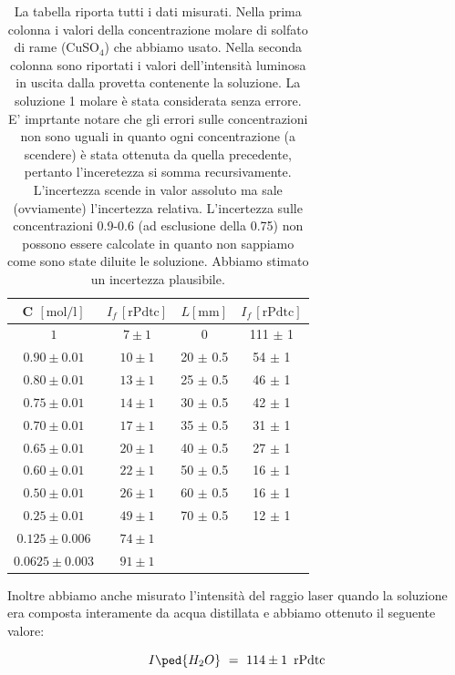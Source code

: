\begin{table}
    \centering
    \small
    \begin{tabular}{c c | c c}
        C $[\si{\mole\per\litre}]$ & $I_f \, [\text{rPdtc}]$ & $L [\si{\milli\m}]$ & $I_f \, [\text{rPdtc}]$ \\
        \midrule
        $1$ 	& $7 \pm 1$               &  0                & 111 $\pm$ 1                 \\
        $0.90 \pm 0.01$ 	& $10 \pm 1$              &  20 $\pm$ 0.5     & 54 $\pm$ 1                    \\        
        $0.80 \pm 0.01$ 	& $13 \pm 1$              &  25 $\pm$ 0.5     & 46 $\pm$ 1                    \\
        $0.75 \pm 0.01$ 	& $14 \pm 1$              &  30 $\pm$ 0.5     & 42 $\pm$ 1                    \\
        $0.70 \pm 0.01$ 	& $17 \pm 1$              &  35 $\pm$ 0.5     & 31 $\pm$ 1                      \\
        $0.65 \pm 0.01$ 	& $20 \pm 1$              &  40 $\pm$ 0.5     & 27 $\pm$ 1                    \\
        $0.60 \pm 0.01$ 	& $22 \pm 1$              &  50 $\pm$ 0.5     & 16 $\pm$ 1                    \\
        $0.50 \pm 0.01$ 	& $26 \pm 1$  &  60 $\pm$ 0.5     & 16 $\pm$ 1                    \\
        $0.25 \pm 0.01$ 	& $49 \pm 1$  &  70 $\pm$ 0.5     & 12 $\pm$ 1                      \\
        $0.125 \pm 0.006$ & $74 \pm 1$      && \\
        $0.0625 \pm 0.003$ & $91 \pm 1$     && \\
        \bottomrule
    \end{tabular}
    \caption{La tabella riporta tutti i dati misurati. Nella prima colonna i valori della concentrazione molare di solfato di rame (CuSO$_4$) che abbiamo usato. Nella seconda colonna sono riportati i valori dell'intensità luminosa in uscita dalla provetta contenente la soluzione. La soluzione 1 molare è stata considerata senza errore. E' imprtante notare che gli errori sulle concentrazioni non sono uguali in quanto ogni concentrazione (a scendere) è stata ottenuta da quella precedente, pertanto l'inceretezza si somma recursivamente. L'incertezza scende in valor assoluto ma sale (ovviamente) l'incertezza relativa. L'incertezza sulle concentrazioni 0.9-0.6 (ad esclusione della 0.75) non possono essere calcolate in quanto non sappiamo come sono state diluite le soluzione. Abbiamo stimato un incertezza plausibile.}
    \label{tab:dati}
\end{table}

Inoltre abbiamo anche misurato l'intensità del raggio laser quando la soluzione era composta interamente da acqua distillata e abbiamo ottenuto il seguente valore:

\begin{equation}
	I\ped{H_2O} \,\,=\,\, 114 \pm 1 \,\,\, \text{rPdtc}
	\label{eq:acqua}
\end{equation}
